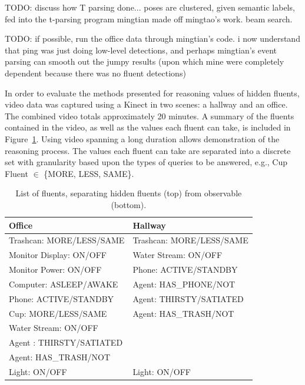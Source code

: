 \documentclass[10pt,journal,letterpaper,compsoc]{IEEEtran}
\begin{document}
TODO: discuss how T parsing done...  poses are clustered, given semantic labels, fed into the t-parsing program mingtian made off mingtao's work.  beam search.

TODO: if possible, run the office data through mingtian's code.  i now understand that ping was just doing low-level detections, and perhaps mingtian's event parsing can smooth out the jumpy results (upon which mine were completely dependent because there was no fluent detections)


In order to evaluate the methods presented for reasoning values of hidden fluents, video data was captured using a Kinect in two scenes: a hallway and an office.  The combined video totals approximately 20 minutes.  A summary of the fluents contained in the video, as well as the values each fluent can take, is included in Figure~\ref{tab:fluentlist}.  Using video spanning a long duration allows demonstration of the reasoning process.  The values each fluent can take are separated into a discrete set with granularity based upon the types of queries to be answered, e.g., Cup Fluent $\in$ \{MORE, LESS, SAME\}.  


\begin{table}[htp]
\centering
\caption{List of fluents, separating hidden fluents (top) from observable (bottom).\label{tab:fluentlist}}
\begin{tabular}{ll}
\toprule
Office & Hallway \\
\midrule
Trashcan: MORE/LESS/SAME & Trashcan: MORE/LESS/SAME \\
Monitor Display: ON/OFF & Water Stream: ON/OFF \\
Monitor Power: ON/OFF & Phone: ACTIVE/STANDBY \\
Computer: ASLEEP/AWAKE & Agent: HAS\_PHONE/NOT\\
Phone: ACTIVE/STANDBY & Agent: THIRSTY/SATIATED\\
Cup: MORE/LESS/SAME & Agent: HAS\_TRASH/NOT\\
Water Stream: ON/OFF & \\
Agent : THIRSTY/SATIATED &  \\
Agent: HAS\_TRASH/NOT &  \\
\midrule 
Light: ON/OFF & Light: ON/OFF \\
\bottomrule
\end{tabular}
\end{table}
\end{document}
